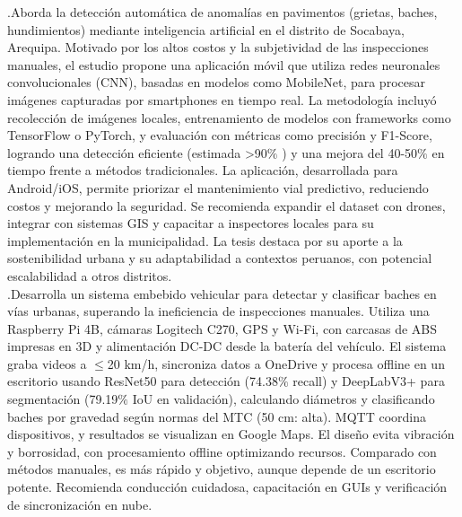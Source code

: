 \noindent \textcite{Chino2024} .Aborda la detección automática de anomalías en pavimentos (grietas, baches, hundimientos) mediante inteligencia artificial en el distrito de Socabaya, Arequipa. Motivado por los altos costos y la subjetividad de las inspecciones manuales, el estudio propone una aplicación móvil que utiliza redes neuronales convolucionales (CNN), basadas en modelos como MobileNet, para procesar imágenes capturadas por smartphones en tiempo real. La metodología incluyó recolección de imágenes locales, entrenamiento de modelos con frameworks como TensorFlow o PyTorch, y evaluación con métricas como precisión y F1-Score, logrando una detección eficiente (estimada >90$\%$ ) y una mejora del 40-50$\%$  en tiempo frente a métodos tradicionales. La aplicación, desarrollada para Android/iOS, permite priorizar el mantenimiento vial predictivo, reduciendo costos y mejorando la seguridad. Se recomienda expandir el dataset con drones, integrar con sistemas GIS y capacitar a inspectores locales para su implementación en la municipalidad. La tesis destaca por su aporte a la sostenibilidad urbana y su adaptabilidad a contextos peruanos, con potencial escalabilidad a otros distritos.\\

\noindent \textcite{zamora2024} .Desarrolla un sistema embebido vehicular para detectar y clasificar baches en vías urbanas, superando la ineficiencia de inspecciones manuales. Utiliza una Raspberry Pi 4B, cámaras Logitech C270, GPS y Wi-Fi, con carcasas de ABS impresas en 3D y alimentación DC-DC desde la batería del vehículo. El sistema graba videos a $\leq$20 km/h, sincroniza datos a OneDrive y procesa offline en un escritorio usando ResNet50 para detección (74.38$\%$ recall) y DeepLabV3+ para segmentación (79.19$\%$ IoU en validación), calculando diámetros y clasificando baches por gravedad según normas del MTC (50 cm: alta). MQTT coordina dispositivos, y resultados se visualizan en Google Maps. El diseño evita vibración y borrosidad, con procesamiento offline optimizando recursos. Comparado con métodos manuales, es más rápido y objetivo, aunque depende de un escritorio potente. Recomienda conducción cuidadosa, capacitación en GUIs y verificación de sincronización en nube.\\


